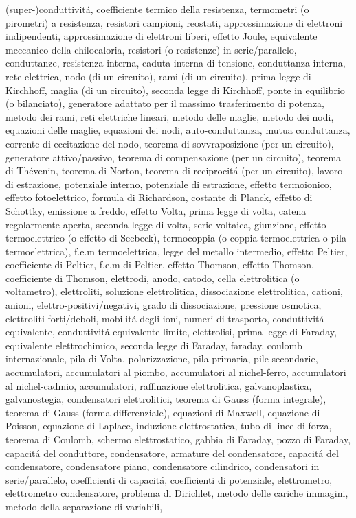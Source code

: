 \begin{multicols}{3}
  (super-)conduttivit\'a,
  coefficiente termico della resistenza,
  termometri (o pirometri) a resistenza,
  resistori campioni,
  reostati,
  approssimazione di elettroni indipendenti,
  approssimazione di elettroni liberi,
  effetto Joule,
  equivalente meccanico della chilocaloria,
  resistori (o resistenze) in serie/parallelo,
  conduttanze,
  resistenza interna,
  caduta interna di tensione,
  conduttanza interna,
  rete elettrica,
  nodo (di un circuito),
  rami (di un circuito),
  prima legge di Kirchhoff,
  maglia (di un circuito),
  seconda legge di Kirchhoff,
  ponte in equilibrio (o bilanciato),
  generatore adattato per il massimo trasferimento di potenza,
  metodo dei rami,
  reti elettriche lineari,
  metodo delle maglie,
  metodo dei nodi,
  equazioni delle maglie,
  equazioni dei nodi,
  auto-conduttanza,
  mutua conduttanza,
  corrente di eccitazione del nodo,
  teorema di sovvraposizione (per un circuito),
  generatore attivo/passivo,
  teorema di compensazione (per un circuito),
  teorema di Th\'evenin,
  teorema di Norton,
  teorema di reciprocit\'a (per un circuito),
  lavoro di estrazione,
  potenziale interno,
  potenziale di estrazione,
  effetto termoionico,
  effetto fotoelettrico,
  formula di Richardson,
  costante di Planck,
  effetto di Schottky,
  emissione a freddo,
  effetto Volta,
  prima legge di volta,
  catena regolarmente aperta,
  seconda legge di volta,
  serie voltaica,
  giunzione,
  effetto termoelettrico (o effetto di Seebeck),
  termocoppia (o coppia termoelettrica o pila termoelettrica),
  f.e.m termoelettrica,
  legge del metallo intermedio,
  effetto Peltier,
  coefficiente di Peltier,
  f.e.m di Peltier,
  effetto Thomson,
  effetto Thomson,
  coefficiente di Thomson,
  elettrodi,
  anodo,
  catodo,
  cella elettrolitica (o voltametro),
  elettroliti,
  soluzione elettrolitica,
  dissociazione elettrolitica,
  cationi,
  anioni,
  elettro-positivi/negativi,
  grado di dissociazione,
  pressione osmotica,
  elettroliti forti/deboli,
  mobilit\'a degli ioni,
  numeri di trasporto,
  conduttivit\'a equivalente,
  conduttivit\'a equivalente limite,
  elettrolisi,
  prima legge di Faraday,
  equivalente elettrochimico,
  seconda legge di Faraday,
  faraday,
  coulomb internazionale,
  pila di Volta,
  polarizzazione,
  pila primaria,
  pile secondarie,
  accumulatori,
  accumulatori al piombo,
  accumulatori al nichel-ferro,
  accumulatori al nichel-cadmio,
  accumulatori,
  raffinazione elettrolitica,
  galvanoplastica,
  galvanostegia,
  condensatori elettrolitici,
  teorema di Gauss (forma integrale),
  teorema di Gauss (forma differenziale),
  equazioni di Maxwell,
  equazione di Poisson,
  equazione di Laplace,
  induzione elettrostatica,
  tubo di linee di forza,
  teorema di Coulomb,
  schermo elettrostatico,
  gabbia di Faraday,
  pozzo di Faraday,
  capacit\'a del conduttore,
  condensatore,
  armature del condensatore,
  capacit\'a del condensatore,
  condensatore piano,
  condensatore cilindrico,
  condensatori in serie/parallelo,
  coefficienti di capacit\'a,
  coefficienti di potenziale,
  elettrometro,
  elettrometro condensatore,
  problema di Dirichlet,
  metodo delle cariche immagini,
  metodo della separazione di variabili,
\end{multicols}




